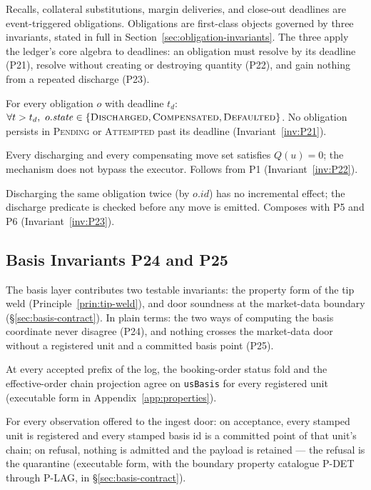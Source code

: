 Recalls, collateral substitutions, margin deliveries, and close-out deadlines are event-triggered obligations. Obligations are first-class objects governed by three invariants, stated in full in Section~\ref{sec:obligation-invariants}. The three apply the ledger's core algebra to deadlines: an obligation must resolve by its deadline (P21), resolve without creating or destroying quantity (P22), and gain nothing from a repeated discharge (P23).

\begin{description}[leftmargin=3.2em,style=nextline]
\item[P21 Obligation liveness] For every obligation $o$ with deadline $t_d$: $\forall t>t_d,\ o.\mathit{state}\in\{\textsc{Discharged},\allowbreak\textsc{Compensated},\allowbreak\textsc{Defaulted}\}$. No obligation persists in \textsc{Pending} or \textsc{Attempted} past its deadline (Invariant~\ref{inv:P21}).
\item[P22 Obligation conservation] Every discharging and every compensating move set satisfies $Q(u)=0$; the mechanism does not bypass the executor. Follows from P1 (Invariant~\ref{inv:P22}).
\item[P23 Obligation idempotency] Discharging the same obligation twice (by $o.\mathit{id}$) has no incremental effect; the discharge predicate is checked before any move is emitted. Composes with P5 and P6 (Invariant~\ref{inv:P23}).
\end{description}

\subsection{Basis Invariants P24 and P25}
\label{sec:invariants-basis}

The basis layer contributes two testable invariants: the property form of the tip weld (Principle~\ref{prin:tip-weld}), and door soundness at the market-data boundary (\S\ref{sec:basis-contract}). In plain terms: the two ways of computing the basis coordinate never disagree (P24), and nothing crosses the market-data door without a registered unit and a committed basis point (P25).

\begin{description}[leftmargin=3.2em,style=nextline]
\item[P24 Basis tip agreement]\label{inv:P24} At every accepted prefix of the log, the booking-order status fold and the effective-order chain projection agree on \texttt{usBasis} for every registered unit (executable form in Appendix~\ref{app:properties}).
\item[P25 Ingest-door soundness]\label{inv:P25} For every observation offered to the ingest door: on acceptance, every stamped unit is registered and every stamped basis id is a committed point of that unit's chain; on refusal, nothing is admitted and the payload is retained --- the refusal is the quarantine (executable form, with the boundary property catalogue P-DET through P-LAG, in \S\ref{sec:basis-contract}).
\end{description}

